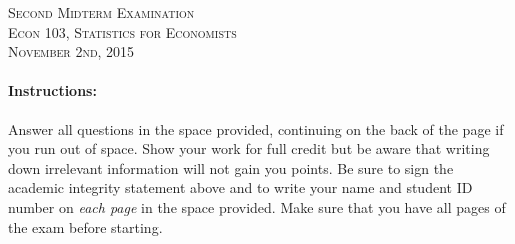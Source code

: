 \documentclass[addpoints,12pt]{exam}
\begin{document}
\begin{center}
\textsc{\large Second Midterm Examination\\ \normalsize Econ 103, Statistics for Economists \\ \vspace{0.5em} November 2nd, 2015}

\vspace{2em}



\end{center}


\vspace{2em}
\begin{center}
\end{center}
\vspace{0.2in}

\vspace{0.2in}

\noindent{}

\vspace{0.2in}

\noindent{}
\hfill
{}

\vspace{2em}

\begin{center}
  \gradetable[h][questions]
\end{center}

\vspace{2em}

\paragraph{Instructions:} Answer all questions in the space provided, continuing on the back of the page if you run out of space. Show your work for full credit but be aware that writing down irrelevant information will not gain you points. Be sure to sign the academic integrity statement above and to write your name and student ID number on \emph{each page} in the space provided. Make sure that you have all pages of the exam before starting.
\end{document}
